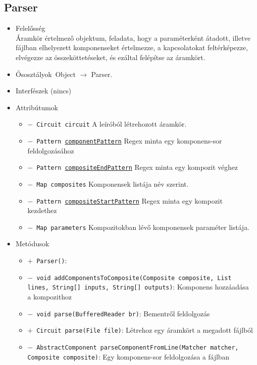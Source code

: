 \subsection{Parser}
\begin{itemize}
\item Felelősség\\
Áramkör értelmező objektum, feladata, hogy a paraméterként átadott, illetve  fájlban elhelyezett komponenseket értelmezze, a kapcsolatokat feltérképezze,  elvégezze az összeköttetéseket, és ezáltal felépítse az áramkört.
\item Ősosztályok\ Object $\rightarrow{}$ Parser.
\item Interfészek (nincs)
\item Attribútumok $\ $
\begin{itemize}
	\item[] \texttt{$-$ Circuit circuit} A leíróból létrehozott áramkör.
	\item[] \texttt{$-$ Pattern \underline{componentPattern}} Regex minta egy komponens-sor feldolgozásához
	\item[] \texttt{$-$ Pattern \underline{compositeEndPattern}} Regex minta egy kompozit véghez
	\item[] \texttt{$-$ Map composites} Komponensek listája név szerint.
	\item[] \texttt{$-$ Pattern \underline{compositeStartPattern}} Regex minta egy kompozit kezdethez
	\item[] \texttt{$-$ Map parameters} Kompozitokban lévő komponensek paraméter listája.
\end{itemize}
\item Metódusok$\ $
\begin{itemize}
	\item[] \texttt{$+$ Parser()}: 
	\item[] \texttt{$-$ void addComponentsToComposite(Composite composite, List lines, String[] inputs, String[] outputs)}: Komponens hozzáadása a kompozithoz
	\item[] \texttt{$-$ void parse(BufferedReader br)}: Bementről feldolgozás
	\item[] \texttt{$+$ Circuit parse(File file)}: Létrehoz egy áramkört a megadott fájlból
	\item[] \texttt{$-$ AbstractComponent parseComponentFromLine(Matcher matcher, Composite composite)}: Egy komponens-sor feldolgozása a fájlban
\end{itemize}
\end{itemize}

